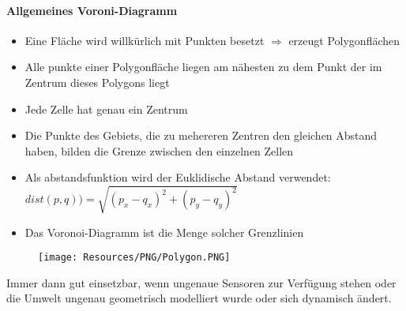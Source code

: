 \paragraph{Allgemeines Voroni-Diagramm}
\begin{itemize}
	\item Eine Fläche wird willkürlich mit Punkten besetzt $\Rightarrow$ erzeugt Polygonflächen
	\item Alle punkte einer Polygonfläche liegen am nähesten zu dem Punkt der im Zentrum dieses Polygons liegt
	\item Jede Zelle hat genau ein Zentrum
	\item Die Punkte des Gebiets, die zu mehereren Zentren den gleichen Abstand haben, bilden die Grenze zwischen den einzelnen Zellen
	\item Als abstandsfunktion wird der Euklidische Abstand verwendet:
	\subitem $dist(p,q) ) = \sqrt{(p_x-q_x)^2 + (p_y-q_y)^2}$
	\item Das Voronoi-Diagramm ist die Menge solcher Grenzlinien
\end{itemize}
\begin{figure}[H]
	\begin{center}
		\texttt{[image: Resources/PNG/Polygon.PNG]}
		\caption{}
		\label{fig:PNG/Polygon.PNG}
	\end{center}
\end{figure}
Immer dann gut einsetzbar, wenn ungenaue Sensoren zur Verfügung stehen oder die Umwelt ungenau geometrisch modelliert wurde oder sich dynamisch ändert.
